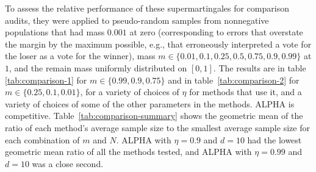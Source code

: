 \documentclass[aoas]{imsart}
\begin{document}
To assess the relative performance of these supermartingales for comparison audits, they were applied to
pseudo-random samples from nonnegative populations that had mass $0.001$ at zero (corresponding to errors that overstate the
margin by the maximum possible, e.g., that erroneously interpreted a vote for the loser as a vote for the winner), 
mass $m \in \{0.01, 0.1, 0.25, 0.5, 0.75, 0.9, 0.99\}$
at $1$, and the remain mass uniformly distributed on $[0, 1]$.
The results are in table \ref{tab:comparison-1} for $m \in \{0.99, 0.9, 0.75\}$ and 
in table~\ref{tab:comparison-2} for $m \in \{0.25, 0.1, 0.01\}$,
for a variety of choices of $\eta$ for methods that use it, and a variety of choices of some of the other parameters
in the methods.
ALPHA is competitive.
Table~\ref{tab:comparison-summary} shows the geometric mean of the ratio of each method's average sample size
to the smallest average sample size for each combination of $m$ and $N$.
ALPHA with $\eta=0.9$ and $d=10$ had the lowest geometric mean ratio of all the methods tested,
and ALPHA with $\eta=0.99$ and $d=10$ was a close second.
\end{document}

